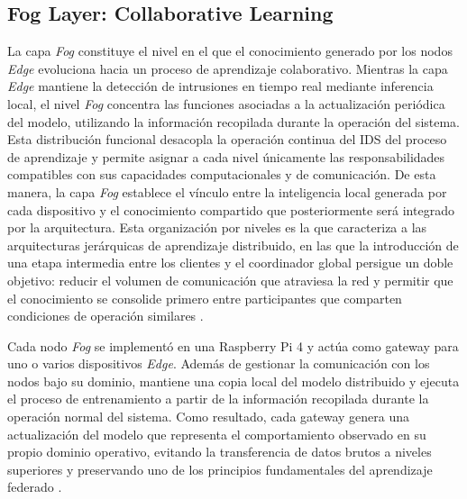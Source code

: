 \documentclass[journal,article,submit,moreauthors]{Definitions/mdpi}
\begin{document}
\subsection{Fog Layer: Collaborative Learning}
La capa \textit{Fog} constituye el nivel en el que el conocimiento generado por los nodos \textit{Edge} evoluciona hacia un proceso de aprendizaje colaborativo. Mientras la capa \textit{Edge} mantiene la detección de intrusiones en tiempo real mediante inferencia local, el nivel \textit{Fog} concentra las funciones asociadas a la actualización periódica del modelo, utilizando la información recopilada durante la operación del sistema. Esta distribución funcional desacopla la operación continua del IDS del proceso de aprendizaje y permite asignar a cada nivel únicamente las responsabilidades compatibles con sus capacidades computacionales y de comunicación. De esta manera, la capa \textit{Fog} establece el vínculo entre la inteligencia local generada por cada dispositivo y el conocimiento compartido que posteriormente será integrado por la arquitectura. Esta organización por niveles es la que caracteriza a las arquitecturas jerárquicas de aprendizaje distribuido, en las que la introducción de una etapa intermedia entre los clientes y el coordinador global persigue un doble objetivo: reducir el volumen de comunicación que atraviesa la red y permitir que el conocimiento se consolide primero entre participantes que comparten condiciones de operación similares \cite{Ma2024,Cooray2025}.

Cada nodo \textit{Fog} se implementó en una Raspberry Pi 4 y actúa como gateway para uno o varios dispositivos \textit{Edge}. Además de gestionar la comunicación con los nodos bajo su dominio, mantiene una copia local del modelo distribuido y ejecuta el proceso de entrenamiento a partir de la información recopilada durante la operación normal del sistema. Como resultado, cada gateway genera una actualización del modelo que representa el comportamiento observado en su propio dominio operativo, evitando la transferencia de datos brutos a niveles superiores y preservando uno de los principios fundamentales del aprendizaje federado \cite{McMahan2017,Imteaj2022,Ramadan2025}.
\end{document}
